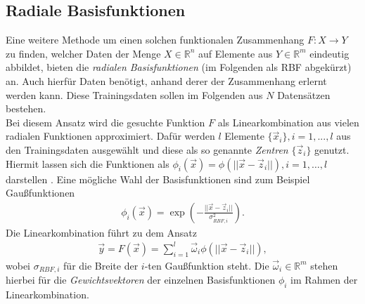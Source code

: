 \subsection{Radiale Basisfunktionen}
Eine weitere Methode um einen solchen funktionalen Zusammenhang $F : X \rightarrow Y$ zu finden, welcher Daten der Menge $X \in \mathbb{R}^n$ auf Elemente aus $Y \in \mathbb{R}^m$ eindeutig abbildet, bieten die \textit{radialen Basisfunktionen} (im Folgenden als \textsc{RBF} abgekürzt) an. Auch hierfür Daten benötigt, anhand derer der Zusammenhang erlernt werden kann. Diese Trainingsdaten sollen im Folgenden aus $N$ Datensätzen bestehen.\\

Bei diesem Ansatz wird die gesuchte Funktion $F$ als Linearkombination aus vielen radialen Funktionen approximiert. Dafür werden $l$ Elemente $\{\vec{x}_i\}, i=1,...,l$ aus den Trainingsdaten ausgewählt und diese als so genannte \textit{Zentren} $\{\vec{z}_i\}$ genutzt. Hiermit lassen sich die Funktionen als $\phi_i(\vec{x}) = \phi(||\vec{x}-\vec{z}_i||), i=1,\ldots ,l$ darstellen \citep{lowe2multi}. Eine mögliche Wahl der Basisfunktionen sind zum Beispiel Gaußfunktionen
\begin{align*}
\phi_i(\vec{x}) = \exp \left( - \frac{||\vec{x}-\vec{z}_i||}{\sigma_{RBF, i}^2} \right).
\end{align*}
Die Linearkombination führt zu dem Ansatz 
\begin{align}
\label{eq:rbf_lincomb}
\vec{y} = F(\vec{x}) = \sum^l_{i=1} \vec{\omega}_i \phi(||\vec{x} - \vec{z}_i||),
\end{align}
wobei $\sigma_{RBF, i}$ für die Breite der $i$-ten Gaußfunktion steht.
Die $\vec{\omega}_i \in \mathbb{R}^m$ stehen hierbei für die \textit{Gewichtsvektoren} der einzelnen Basisfunktionen $\phi_i$ im Rahmen der Linearkombination.\\

